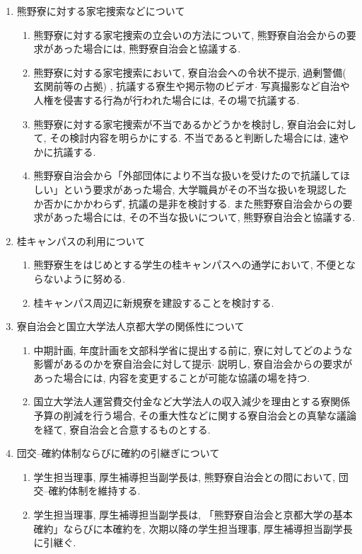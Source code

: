 \documentclass[10pt,b5jsbook,dvips,dvipdfmx,openany]{jsbook}
\theoremstyle{definition}
\begin{document}
\begin{shadebox}
\begin{enumerate}
\begin{enumerate}
			\end{enumerate}
		\item 熊野寮に対する家宅捜索などについて
			\begin{enumerate}
			\renewcommand{\labelenumii}{(\arabic{enumii})}
			\item 熊野寮に対する家宅捜索の立会いの方法について, 熊野寮自治会からの要求があった場合には, 熊野寮自治会と協議する. 
			\item 熊野寮に対する家宅捜索において, 寮自治会への令状不提示, 過剰警備( 玄関前等の占拠) , 抗議する寮生や掲示物のビデオ$ \cdot $ 写真撮影など自治や人権を侵害する行為が行われた場合には, その場で抗議する. 
			\item 熊野寮に対する家宅捜索が不当であるかどうかを検討し, 寮自治会に対して, その検討内容を明らかにする. 不当であると判断した場合には, 速やかに抗議する. 
			\item 熊野寮自治会から「外部団体により不当な扱いを受けたので抗議してほしい」という要求があった場合, 大学職員がその不当な扱いを現認したか否かにかかわらず, 抗議の是非を検討する. また熊野寮自治会からの要求があった場合には, その不当な扱いについて, 熊野寮自治会と協議する. 
			\end{enumerate}
		\item 桂キャンパスの利用について
			\begin{enumerate}
			\renewcommand{\labelenumii}{(\arabic{enumii})}
			\item 熊野寮生をはじめとする学生の桂キャンパスへの通学において, 不便とならないように努める. 
			\item 桂キャンパス周辺に新規寮を建設することを検討する. 
			\end{enumerate}
		\item 寮自治会と国立大学法人京都大学の関係性について
			\begin{enumerate}
			\renewcommand{\labelenumii}{(\arabic{enumii})}
			\item 中期計画, 年度計画を文部科学省に提出する前に, 寮に対してどのような影響があるのかを寮自治会に対して提示$ \cdot $ 説明し, 寮自治会からの要求があった場合には, 内容を変更することが可能な協議の場を持つ. 
			\item 国立大学法人運営費交付金など大学法人の収入減少を理由とする寮関係予算の削減を行う場合, その重大性などに関する寮自治会との真摯な議論を経て, 寮自治会と合意するものとする. 
			\end{enumerate}
		\item 団交--確約体制ならびに確約の引継ぎについて
			\begin{enumerate}
			\renewcommand{\labelenumii}{(\arabic{enumii})}
			\item 学生担当理事, 厚生補導担当副学長は, 熊野寮自治会との間において, 団交--確約体制を維持する. 
			\item 学生担当理事, 厚生補導担当副学長は, 「熊野寮自治会と京都大学の基本確約」ならびに本確約を, 次期以降の学生担当理事, 厚生補導担当副学長に引継ぐ. 
			\end{enumerate}
		\end{enumerate}

		\end{shadebox}
		
\end{document}
